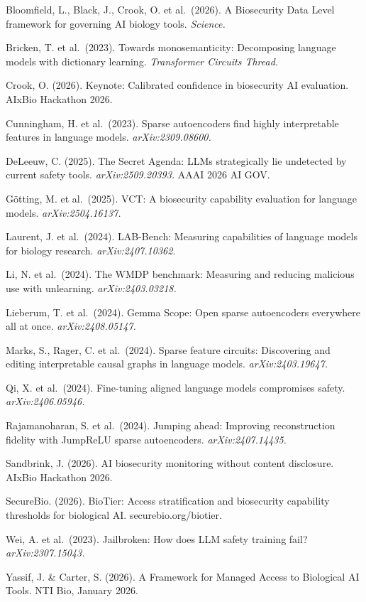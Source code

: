 \documentclass[
  11pt,
]{article}
\begin{document}
Bloomfield, L., Black, J., Crook, O. et al.~(2026). A Biosecurity Data
Level framework for governing AI biology tools. \emph{Science.}

Bricken, T. et al.~(2023). Towards monosemanticity: Decomposing language
models with dictionary learning. \emph{Transformer Circuits Thread.}

Crook, O. (2026). Keynote: Calibrated confidence in biosecurity AI
evaluation. AIxBio Hackathon 2026.

Cunningham, H. et al.~(2023). Sparse autoencoders find highly
interpretable features in language models. \emph{arXiv:2309.08600.}

DeLeeuw, C. (2025). The Secret Agenda: LLMs strategically lie undetected
by current safety tools. \emph{arXiv:2509.20393.} AAAI 2026 AI GOV.

Götting, M. et al.~(2025). VCT: A biosecurity capability evaluation for
language models. \emph{arXiv:2504.16137.}

Laurent, J. et al.~(2024). LAB-Bench: Measuring capabilities of language
models for biology research. \emph{arXiv:2407.10362.}

Li, N. et al.~(2024). The WMDP benchmark: Measuring and reducing
malicious use with unlearning. \emph{arXiv:2403.03218.}

Lieberum, T. et al.~(2024). Gemma Scope: Open sparse autoencoders
everywhere all at once. \emph{arXiv:2408.05147.}

Marks, S., Rager, C. et al.~(2024). Sparse feature circuits: Discovering
and editing interpretable causal graphs in language models.
\emph{arXiv:2403.19647.}

Qi, X. et al.~(2024). Fine-tuning aligned language models compromises
safety. \emph{arXiv:2406.05946.}

Rajamanoharan, S. et al.~(2024). Jumping ahead: Improving reconstruction
fidelity with JumpReLU sparse autoencoders. \emph{arXiv:2407.14435.}

Sandbrink, J. (2026). AI biosecurity monitoring without content
disclosure. AIxBio Hackathon 2026.

SecureBio. (2026). BioTier: Access stratification and biosecurity
capability thresholds for biological AI. securebio.org/biotier.

Wei, A. et al.~(2023). Jailbroken: How does LLM safety training fail?
\emph{arXiv:2307.15043.}

Yassif, J. \& Carter, S. (2026). A Framework for Managed Access to
Biological AI Tools. NTI Bio, January 2026.
\end{document}
